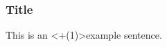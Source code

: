 \documentclass{beamer}
\begin{document}
\begin{frame}
  \frametitle{Title}
  This is an \alert<+(1)>{example} sentence.
\end{frame}
\end{document}
